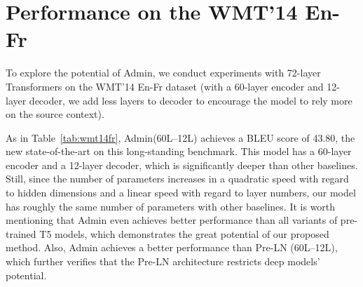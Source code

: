 \documentclass[11pt,a4paper]{article}
\newcommand{\our}{\mbox{Admin}\xspace}
\begin{document}
\section{Performance on the WMT'14 En-Fr}
\label{appendix:enfr}

To explore the potential of \our, we conduct experiments with 72-layer Transformers on the WMT'14 En-Fr dataset (with a 60-layer encoder and 12-layer decoder, we add less layers to decoder to encourage the model to rely more on the source context). 

As in Table~\ref{tab:wmt14fr}, \our (60L--12L) achieves a BLEU score of 43.80, the new state-of-the-art on this long-standing benchmark. 
This model has a 60-layer encoder and a 12-layer decoder, which is significantly deeper than other baselines.
Still, since the number of parameters increases in a quadratic speed with regard to hidden dimensions and a linear speed with regard to layer numbers, our model has roughly the same number of parameters with other baselines. 
It is worth mentioning that \our even achieves better performance than all variants of pre-trained T5 models, which demonstrates the great potential of our proposed method.
Also, \our achieves a better performance than Pre-LN (60L--12L), which further verifies that the Pre-LN architecture restricts deep models' potential. 




 
\end{document}
